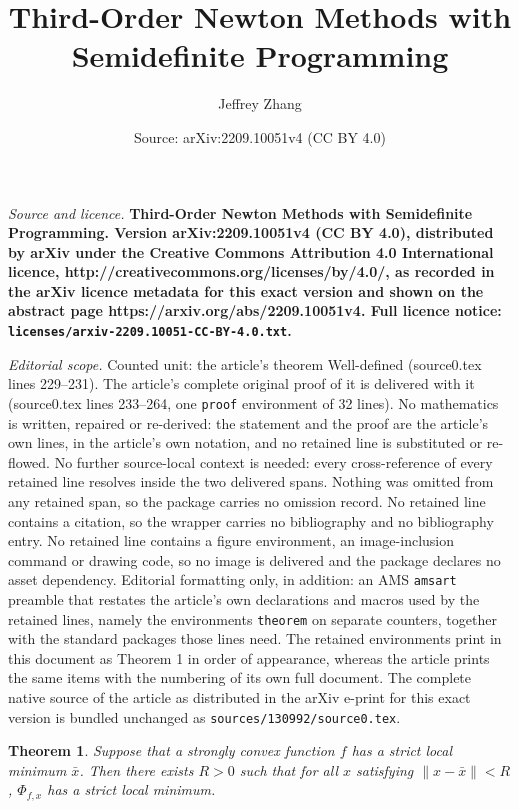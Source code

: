 \documentclass[10pt,a4paper]{amsart}
\title{\LARGE \bf Third-Order Newton Methods with Semidefinite Programming}
\author{Jeffrey Zhang}
\date{Source: arXiv:2209.10051v4 (CC BY 4.0)}
\newtheorem{theorem}{Theorem}
\def \xbar{\bar{x}}
\begin{document}
\maketitle

\noindent\emph{Source and licence.} \LARGE \bf Third-Order Newton Methods with Semidefinite Programming. Version arXiv:2209.10051v4 (CC BY 4.0), distributed by arXiv under the Creative Commons Attribution 4.0 International licence, http://creativecommons.org/licenses/by/4.0/, as recorded in the arXiv licence metadata for this exact version and shown on the abstract page https://arxiv.org/abs/2209.10051v4. Full licence notice: \texttt{licenses/arxiv-2209.10051-CC-BY-4.0.txt}.\par\smallskip

\noindent\textit{Editorial scope.} Counted unit: the article's theorem Well-defined (source0.tex lines 229--231). The article's complete original proof of it is delivered with it (source0.tex lines 233--264, one \texttt{proof} environment of 32 lines). No mathematics is written, repaired or re-derived: the statement and the proof are the article's own lines, in the article's own notation, and no retained line is substituted or re-flowed.  No further source-local context is needed: every cross-reference of every retained line resolves inside the two delivered spans.  Nothing was omitted from any retained span, so the package carries no omission record.  No retained line contains a citation, so the wrapper carries no bibliography and no bibliography entry.  No retained line contains a figure environment, an image-inclusion command or drawing code, so no image is delivered and the package declares no asset dependency.  Editorial formatting only, in addition: an AMS \texttt{amsart} preamble that restates the article's own declarations and macros used by the retained lines, namely the environments \texttt{theorem} on separate counters, together with the standard packages those lines need.  The retained environments print in this document as Theorem 1 in order of appearance, whereas the article prints the same items with the numbering of its own full document.  The complete native source of the article as distributed in the arXiv e-print for this exact version is bundled unchanged as \texttt{sources/130992/source0.tex}.
\begin{theorem}\label{Thm: Well-defined}
Suppose that a strongly convex function $f$ has a strict local minimum $\xbar$. Then there exists $R > 0$ such that for all $x$ satisfying $\|x - \xbar\| < R$, $\Phi_{f,x}$ has a strict local minimum.
\end{theorem}
\end{document}
